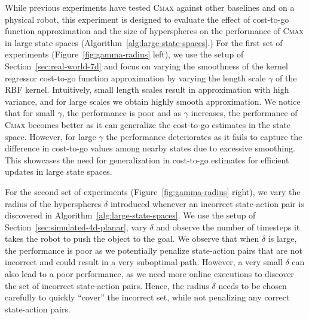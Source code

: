 While previous experiments have tested \textsc{Cmax} against other
baselines and on a physical robot, this experiment is designed to
evaluate the effect of cost-to-go function approximation and the size
of hyperspheres on the
performance of \textsc{Cmax} in large state spaces (Algorithm~\ref{alg:large-state-spaces}.)
For the first set of experiments (Figure~\ref{fig:gamma-radius} left), we use the setup of
Section~\ref{sec:real-world-7d} and focus on varying the smoothness of the kernel
regressor cost-to-go function approximation
by varying the length scale $\gamma$ of the RBF kernel.
Intuitively, small length scales result in approximation with high
variance, and for large scales we obtain highly smooth approximation.
We notice that for small $\gamma$, the performance is poor and
as $\gamma$ increases, the performance of \textsc{Cmax}
becomes better as it can generalize the cost-to-go estimates
in the state space. However, for large $\gamma$ the performance
deteriorates as it fails to capture the difference in cost-to-go
values among nearby states due to excessive smoothing. This showcases
the need for generalization in cost-to-go
estimates for efficient updates in large state spaces.

For the second set of experiments (Figure~\ref{fig:gamma-radius}
right), we vary the radius of the 
hyperspheres $\delta$ introduced whenever an incorrect
state-action pair is discovered in
Algorithm~\ref{alg:large-state-spaces}. We use the setup of
Section~\ref{sec:simulated-4d-planar}, vary 
$\delta$ and observe the number of timesteps it takes the robot to
push the object to the goal. We observe that when $\delta$ is
large, the performance is poor as we potentially penalize state-action
pairs that are not incorrect and could result in a very suboptimal
path. However, a very small $\delta$ can also lead to a poor
performance, as we need more online executions to discover the set of
incorrect state-action pairs. Hence, the radius $\delta$ needs to be
chosen carefully to quickly ``cover'' the incorrect set, while not
penalizing any correct state-action pairs.

